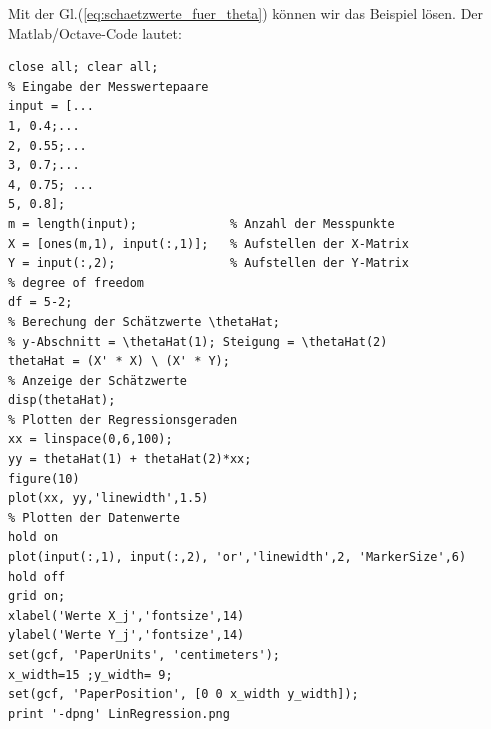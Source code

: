 Mit der Gl.(\ref{eq:schaetzwerte_fuer_theta}) können wir 
das Beispiel lösen. Der Matlab/Octave-Code lautet: 
\begin{verbatim}
close all; clear all;
% Eingabe der Messwertepaare
input = [...                 
1, 0.4;...                
2, 0.55;...
3, 0.7;...
4, 0.75; ...
5, 0.8];
m = length(input);             % Anzahl der Messpunkte
X = [ones(m,1), input(:,1)];   % Aufstellen der X-Matrix
Y = input(:,2);                % Aufstellen der Y-Matrix
% degree of freedom 
df = 5-2;
% Berechung der Schätzwerte \thetaHat; 
% y-Abschnitt = \thetaHat(1); Steigung = \thetaHat(2)
thetaHat = (X' * X) \ (X' * Y);    
% Anzeige der Schätzwerte
disp(thetaHat);
% Plotten der Regressionsgeraden
xx = linspace(0,6,100);
yy = thetaHat(1) + thetaHat(2)*xx;
figure(10)
plot(xx, yy,'linewidth',1.5)
% Plotten der Datenwerte 
hold on
plot(input(:,1), input(:,2), 'or','linewidth',2, 'MarkerSize',6)
hold off
grid on; 
xlabel('Werte X_j','fontsize',14)
ylabel('Werte Y_j','fontsize',14)
set(gcf, 'PaperUnits', 'centimeters');
x_width=15 ;y_width= 9;
set(gcf, 'PaperPosition', [0 0 x_width y_width]);
print '-dpng' LinRegression.png
\end{verbatim}

